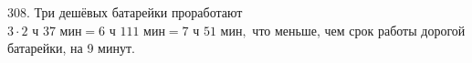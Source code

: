 308. Три дешёвых батарейки проработают $3\cdot2\text{ ч }37\text{ мин}=6\text{ ч } 111\text{ мин}=7\text{ ч }51\text{ мин},$ что меньше, чем срок работы дорогой батарейки, на 9 минут.\\
